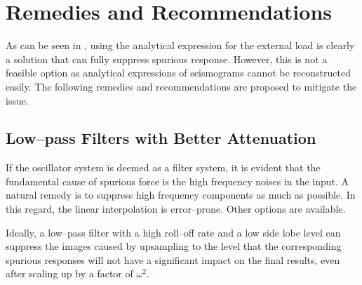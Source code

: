 %
\section{Remedies and Recommendations}
As can be seen in , using the analytical expression for the external load is clearly a solution that can fully suppress spurious response. However, this is not a feasible option as analytical expressions of seismograms cannot be reconstructed easily. The following remedies and recommendations are proposed to mitigate the issue.
\subsection{Low--pass Filters with Better Attenuation}
If the oscillator system is deemed as a filter system, it is evident that the fundamental cause of spurious force is the high frequency noises in the input. A natural remedy is to suppress high frequency components as much as possible. In this regard, the linear interpolation is error--prone. Other options are available.

Ideally, a low--pass filter with a high roll--off rate and a low side lobe level can suppress the images caused by upsampling to the level that the corresponding spurious responses will not have a significant impact on the final results, even after scaling up by a factor of $\omega^2$.

